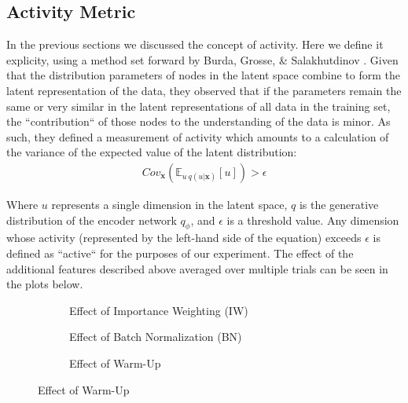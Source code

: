 \documentclass{article} %
\begin{document}
\subsection{Activity Metric}
In the previous sections we discussed the concept of activity. Here we define it explicity, using a method set forward by Burda, Grosse, \& Salakhutdinov \cite{Burda2016}. Given that the distribution parameters of nodes in the latent space combine to form the latent representation of the data, they observed that if the parameters remain the same or very similar in the latent representations of all data in the training set, the ``contribution`` of those nodes to the understanding of the data is minor. As such, they defined a measurement of activity which amounts to a calculation of the variance of the expected value of the latent distribution:
\begin{align}
  Cov_{\textbf{x}}\left(\mathbb{E}_{u~q(u|\textbf{x})}[u]\right)>\epsilon
  \label{eq:ACTIVITYMET}
\end{align}
\par Where $u$ represents a single dimension in the latent space, $q$ is the generative distribution of the encoder network $q_\phi$, and $\epsilon$ is a threshold value. Any dimension whose activity (represented by the left-hand side of the equation) exceeds $\epsilon$ is defined as ``active`` for the purposes of our experiment. The effect of the additional features described above averaged over multiple trials can be seen in the plots below.
\begin{figure}[h]
  \centering
  \begin{subfigure}[t]{0.3\textwidth}
    \resizebox{\linewidth}{!}{}
    \caption{Effect of Importance Weighting (IW)}
    \label{fig:iwlat}
  \end{subfigure}
  \begin{subfigure}[t]{0.3\textwidth}
    \resizebox{\linewidth}{!}{}
    \caption{Effect of Batch Normalization (BN)}
    \label{fig:bnlat}
  \end{subfigure}
  \begin{subfigure}[t]{0.3\textwidth}
    \resizebox{\linewidth}{!}{}
    \caption{Effect of Warm-Up}
    \label{fig:wulat}
  \end{subfigure}
\end{figure}
\end{document}
